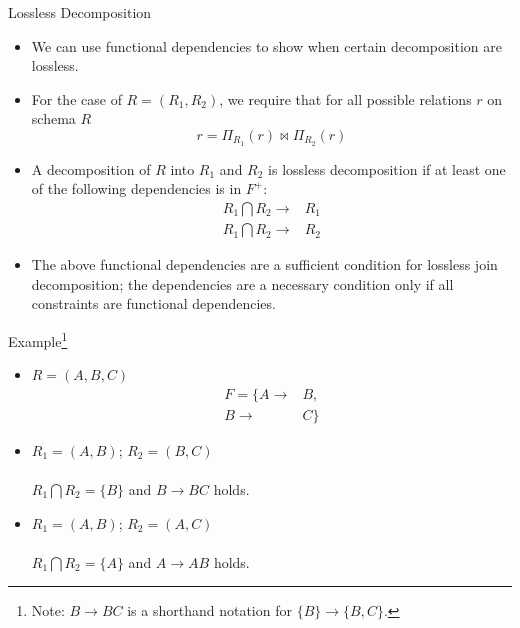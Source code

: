 \documentclass[aspectratio=169]{beamer}
\begin{document}
\begin{frame}{Lossless Decomposition}
    \begin{itemize}
        \item We can use functional dependencies to show when certain decomposition are lossless.
        \item For the case of $R = (R_1, R_2)$, we require that for all possible relations $r$ on schema $R$
            $$
                r = \Pi_{R_1}(r) \Join \Pi_{R_2}(r)
            $$
        \item A decomposition of $R$ into $R_1$ and $R_2$ is lossless decomposition if at least one of the following dependencies is in $F^+$:
        \begin{equation*}
            \begin{align*}
                R_1 \bigcap R_2 \rightarrow& R_1 \\
                R_1 \bigcap R_2 \rightarrow& R_2
            \end{align*}
        \end{equation*}
        \item The above functional dependencies are a sufficient condition for lossless join decomposition; the dependencies are a necessary condition only if all constraints are functional dependencies.
    \end{itemize}
\end{frame}

\begin{frame}{Example\footnote{Note: $B \rightarrow BC$ is a shorthand notation for $\{B\} \rightarrow \{B, C\}$.}}
    \begin{itemize}
        \item $R = (A, B, C)$
            \begin{equation*}
                \begin{align*}
                    F = \{  A \rightarrow& B, \\
                            B \rightarrow& C\}
                \end{align*}
            \end{equation*}

        \item $R_1 = (A, B)$; $R_2 = (B, C)$ \\
             \\
            $R_1 \bigcap R_2 = \{B\}$  and $B \rightarrow BC$ holds.
        \item $R_1 = (A, B)$; $R_2 = (A, C)$ \\
             \\
            $R_1 \bigcap R_2 = \{A\}$  and $A \rightarrow AB$ holds.
    \end{itemize}
\end{frame}
\end{document}
